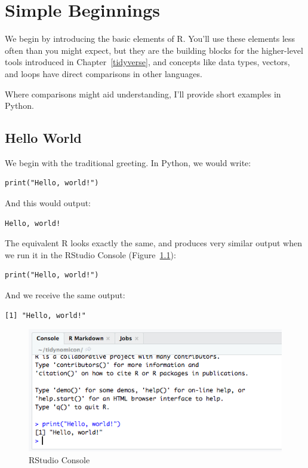 \chapter{Simple Beginnings}\label{basics}

We begin by introducing the basic elements of R.
You'll use these elements less often than you might expect,
but they are the building blocks for the higher-level tools introduced in Chapter~\ref{tidyverse},
and concepts like data types, vectors, and loops have direct comparisons in other languages.

Where comparisons might aid understanding,
I'll provide short examples in Python.

\section{Hello World}

We begin with the traditional greeting.
In Python, we would write:

\begin{lstlisting}
print("Hello, world!")
\end{lstlisting}
And this would output:
\begin{lstlisting}
Hello, world!
\end{lstlisting}

The equivalent R looks exactly the same,
and produces very similar output when we run it in the RStudio Console (Figure~\ref{fig:console}):

\begin{lstlisting}
print("Hello, world!")
\end{lstlisting}
And we receive the same output:
\begin{lstlisting}
[1] "Hello, world!"
\end{lstlisting}


\begin{figure}[h]
  \includegraphics[width=7.11in]{figures/basics/console}
  \caption{RStudio Console}
  \label{fig:console}
\end{figure}

